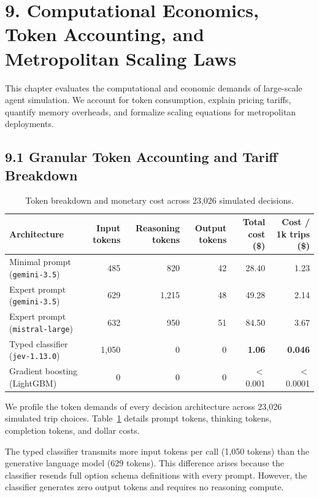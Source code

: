 \section{9. Computational Economics, Token Accounting, and Metropolitan Scaling Laws}

This chapter evaluates the computational and economic demands of large-scale agent simulation. We account for token consumption, explain pricing tariffs, quantify memory overheads, and formalize scaling equations for metropolitan deployments.

\subsection{9.1 Granular Token Accounting and Tariff Breakdown}

\begin{table}[t]
\centering
\caption{Token breakdown and monetary cost across 23,026 simulated decisions.}
\label{tab-token_breakdown}
\small
\begin{tabular}{lrrrrr}
\toprule
\textbf{Architecture} & \textbf{Input tokens} & \textbf{Reasoning tokens} & \textbf{Output tokens} & \textbf{Total cost (\$)} & \textbf{Cost / 1k trips (\$)} \\
\midrule
Minimal prompt (\texttt{gemini-3.5}) & 485 & 820 & 42 & 28.40 & 1.23 \\
Expert prompt (\texttt{gemini-3.5}) & 629 & 1,215 & 48 & 49.28 & 2.14 \\
Expert prompt (\texttt{mistral-large}) & 632 & 950 & 51 & 84.50 & 3.67 \\
Typed classifier (\texttt{jev-1.13.0}) & 1,050 & 0 & 0 & \textbf{1.06} & \textbf{0.046} \\
Gradient boosting (LightGBM) & 0 & 0 & 0 & $<$ 0.001 & $<$ 0.0001 \\
\bottomrule
\end{tabular}
\end{table}

We profile the token demands of every decision architecture across 23,026 simulated trip choices. Table~\ref{tab-token_breakdown} details prompt tokens, thinking tokens, completion tokens, and dollar costs.

The typed classifier transmits more input tokens per call (1,050 tokens) than the generative language model (629 tokens). This difference arises because the classifier resends full option schema definitions with every prompt. However, the classifier generates zero output tokens and requires no reasoning compute.

